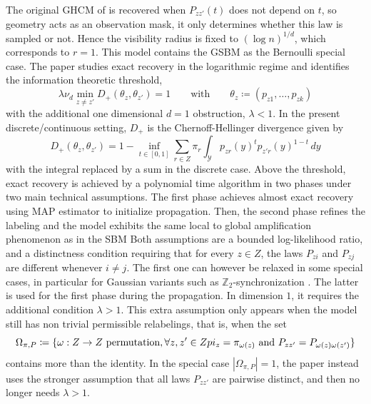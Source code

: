 \documentclass[runningheads]{llncs}
\begin{document}
The original GHCM of \citep{gaudio2024exact} is recovered when \(P_{zz'}(t)\) does not depend on \(t\), so geometry acts as an observation mask, it only determines whether this law is sampled or not. Hence the visibility radius is fixed to \((\log n)^{1/d}\), which corresponds to \(r=1\). This model contains the GSBM as the Bernoulli special case. The paper studies exact recovery in the logarithmic regime and identifies the information theoretic threshold,
\[
\lambda \nu_d \min_{z\neq z'} D_+(\theta_z,\theta_{z'})=1
\qquad \text{with} \qquad
\theta_z\coloneqq(p_{z1},\dots,p_{zk})
\]
with the additional one dimensional \(d=1\) obstruction, \(\lambda<1\). 
In the present discrete/continuous setting, \(D
_+\) is the Chernoff-Hellinger divergence given by
\[
D_+(\theta_z,\theta_{z'})
=
1-\inf_{t\in[0,1]}
\sum_{r\in Z}\pi_r \int_{ \mathcal{Y} } p_{zr}(y)^t p_{z'r}(y)^{1-t}\,dy
\]
with the integral replaced by a sum in the discrete case. Above the threshold, exact recovery is achieved by a polynomial time algorithm in two phases under two main technical assumptions. The first phase achieves almost exact recovery using MAP estimator to initialize propagation.
Then, the second phase refines the labeling and the model exhibits the same local to global amplification phenomenon as in the SBM \citep{abbe2018community}
Both assumptions are a bounded log-likelihood ratio, and a distinctness condition requiring that for every \(z\in Z\), the laws \(P_{zi}\) and \(P_{zj}\) are different whenever \(i\neq j\). The first one can however be relaxed in some special cases, in particular for Gaussian variants such as \(\mathbb Z_2\)-synchronization \citep{gaudio2024exact}.
The latter is used for the first phase during the propagation.
In dimension \(1\), it requires the additional condition \(\lambda>1\). This extra assumption only appears when the model still has non trivial permissible relabelings, that is, when the set
\[
\Omega_{\pi,P}\coloneqq \{\omega:Z\to Z \text{ permutation}, \forall z,z'\in Z \\pi_z=\pi_{\omega(z)} \text{ and } P_{zz'}=P_{\omega(z)\omega(z')} \}
\]
contains more than the identity. In the special case \(|\Omega_{\pi,P}|=1\), the paper instead uses the stronger assumption that all laws \(P_{zz'}\) are pairwise distinct, and then no longer needs \(\lambda>1\).
\end{document}
